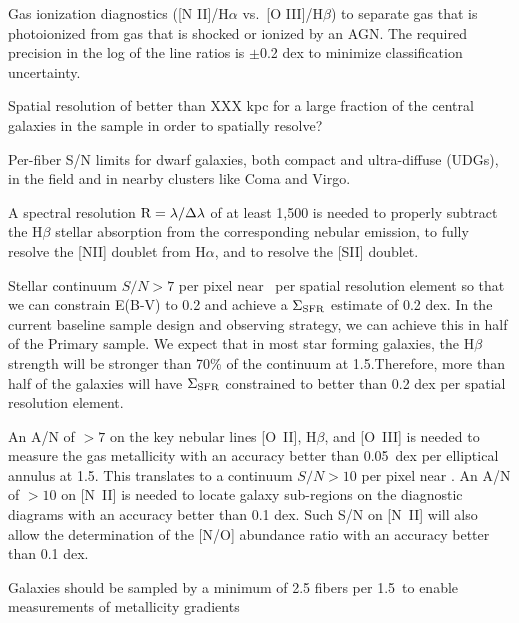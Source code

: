 \documentclass[11pt,a4paper,twoside,onecolumn,openany,final,oldfontcommands]{memoir}
\begin{document}
\begin{sciencerequirement}

\reqitem Gas ionization diagnostics ([N II]/H$\alpha$ vs.\ [O III]/H$\beta$) to separate gas that is photoionized from gas that is shocked or ionized by an AGN. The required precision in the log of the line ratios is $\pm$0.2 dex to minimize classification uncertainty.

\reqitem Spatial resolution of better than XXX kpc for a large fraction of the central galaxies in the sample in order to spatially resolve?

\reqitem Per-fiber S/N limits for dwarf galaxies, both compact and ultra-diffuse (UDGs), in the field and in nearby clusters like Coma and Virgo.

\reqitem A spectral resolution $\rm R=\lambda/\Delta \lambda$ of at least 1,500 is needed to properly subtract the H$\beta$ stellar absorption from the corresponding nebular emission, to fully resolve the [NII] doublet from H$\alpha$, and to resolve the [SII] doublet.

\reqitem Stellar continuum $S/N > 7$ per pixel near \Hbeta\ per spatial resolution element so that we can constrain E(B-V) to 0.2 and achieve a ${\rm \Sigma_{SFR}}$ estimate of 0.2 dex. In the current baseline sample design and observing strategy, we can achieve this in half of the Primary sample. We expect that in most star forming galaxies, the H$\beta$ strength will be stronger than 70\% of the continuum at 1.5\Reff.Therefore, more than half of the galaxies will have ${\rm \Sigma_{SFR}}$ constrained to better than 0.2 dex per spatial resolution element.

\reqitem An A/N of $>7$ on the key nebular lines [O~II], H$\beta$, and [O~III] is needed to measure the gas metallicity with an accuracy better than 0.05~dex per elliptical annulus at 1.5\Reff. This translates to a continuum $S/N > 10$ per pixel near \Hbeta. An A/N of $>10$ on [N~II] is needed to locate galaxy sub-regions on the diagnostic diagrams with an accuracy better than 0.1 dex. Such S/N on [N~II] will also allow the determination of the [N/O] abundance ratio with an accuracy better than 0.1 dex.  %


\reqitem Galaxies should be sampled by a minimum of 2.5 fibers per 1.5\Reff\ to enable measurements of metallicity gradients 


\end{sciencerequirement}
\end{document}
